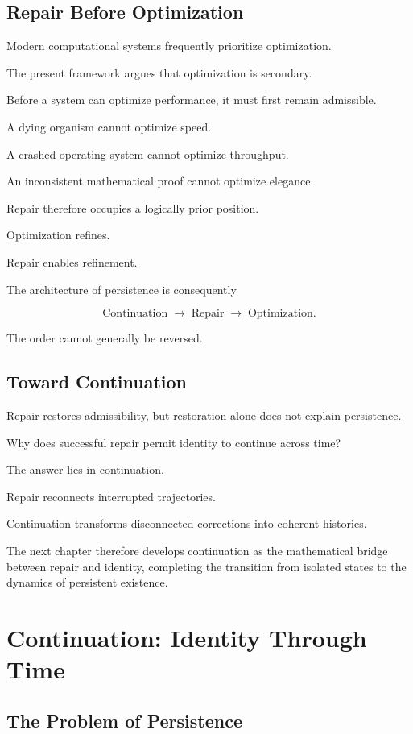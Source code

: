 \documentclass[11pt,oneside]{book}
\numberwithin{equation}{chapter}
\theoremstyle{definition}
\theoremstyle{plain}
\begin{document}
\section{Repair Before Optimization}

Modern computational systems frequently prioritize optimization.

The present framework argues that optimization is secondary.

Before a system can optimize performance, it must first remain admissible.

A dying organism cannot optimize speed.

A crashed operating system cannot optimize throughput.

An inconsistent mathematical proof cannot optimize elegance.

Repair therefore occupies a logically prior position.

Optimization refines.

Repair enables refinement.

The architecture of persistence is consequently

\[
\text{Continuation}
\;\rightarrow\;
\text{Repair}
\;\rightarrow\;
\text{Optimization}.
\]

The order cannot generally be reversed.

\section{Toward Continuation}

Repair restores admissibility, but restoration alone does not explain
persistence.

Why does successful repair permit identity to continue across time?

The answer lies in continuation.

Repair reconnects interrupted trajectories.

Continuation transforms disconnected corrections into coherent histories.

The next chapter therefore develops continuation as the mathematical bridge
between repair and identity, completing the transition from isolated states
to the dynamics of persistent existence.

\chapter{Continuation: Identity Through Time}

\section{The Problem of Persistence}
\end{document}
